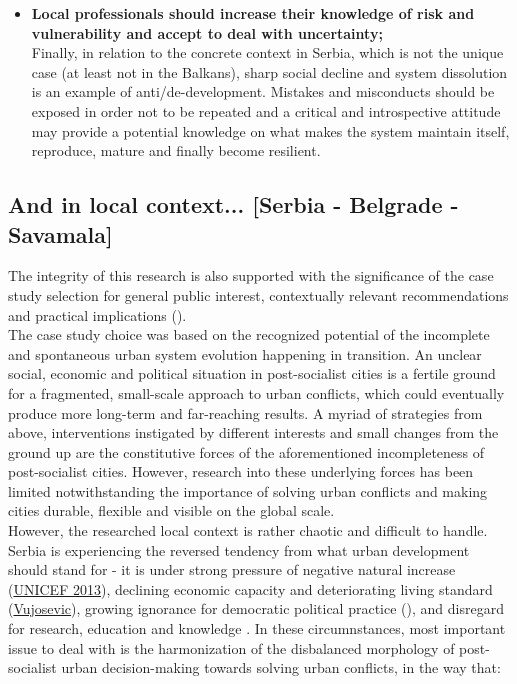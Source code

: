 \documentclass[11pt]{report}
\begin{document}
{\begin{itemize}
\item {\textbf{Local professionals should increase their knowledge of risk and vulnerability and accept to deal with uncertainty;}}
\\
Finally, in relation to the concrete context in Serbia, which is not the unique case (at least not in the Balkans), sharp social decline and system dissolution is an example of anti/de-development.
Mistakes and misconducts should be exposed in order not to be repeated and a critical and introspective attitude may provide a potential knowledge on what makes the system maintain itself, reproduce, mature and finally become resilient.
\end{itemize}

\subsection{And in local context... [Serbia - Belgrade - Savamala]}

The integrity of this research is also supported with the significance of the case study selection for general public interest, contextually relevant recommendations and practical implications (\href{ref}{\citealt{yin_case_2009}}).
\\

The case study choice was based on the recognized potential of the incomplete and spontaneous urban system evolution happening in transition.
An unclear social, economic and political situation in post-socialist cities is a fertile ground for a fragmented, small-scale approach to urban conflicts, which could eventually produce more long-term and far-reaching results.
A myriad of strategies from above, interventions instigated by different interests and small changes from the ground up are the constitutive forces of the aforementioned incompleteness of post-socialist cities.
However, research into these underlying forces has been limited notwithstanding the importance of solving urban conflicts and making cities durable, flexible and visible on the global scale.
\\

However, the researched local context is rather chaotic and difficult to handle.
Serbia is experiencing the reversed tendency from what urban development should stand for - it is under strong pressure of negative natural increase (\href{ref}{UNICEF 2013}), declining economic capacity and deteriorating living standard (\href{ref}{Vujosevic}), growing ignorance for democratic political practice (\href{ref}{\citealt{peric_evolution_2016}}), and disregard for research, education and  knowledge \href{ref}{\citealt{vujosevic_conundrum_2012}}.
In these circumnstances, most important issue to deal with is the harmonization of the disbalanced morphology of post-socialist urban decision-making towards solving urban conflicts, in the way that:

}
\end{document}
